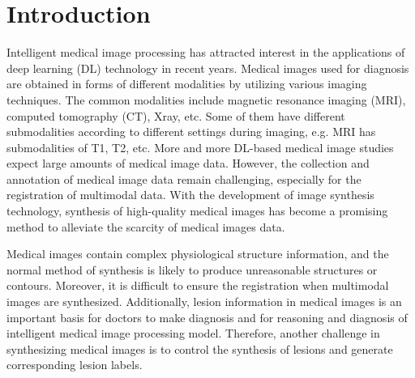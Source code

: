 \documentclass[runningheads]{llncs}
\begin{document}
	\section{Introduction}
	Intelligent medical image processing has attracted interest in the applications of deep learning (DL) technology in recent years. Medical images used for diagnosis are obtained in forms of different modalities by utilizing various imaging techniques. The common modalities include magnetic resonance imaging (MRI), computed tomography (CT), Xray, etc. Some of them have different submodalities according to different settings during imaging, e.g. MRI has submodalities of T1, T2, etc. More and more DL-based medical image studies expect large amounts of medical image data. However, the collection and annotation of medical image data remain challenging, especially for the registration of multimodal data. With the development of image synthesis technology, synthesis of high-quality medical images has become a promising method to alleviate the scarcity of medical images data.
	
	Medical images contain complex physiological structure information, and the normal method of synthesis is likely to produce unreasonable structures or contours. Moreover, it is difficult to ensure the registration when multimodal images are synthesized. Additionally, lesion information in medical images is an important basis for doctors to make diagnosis and for reasoning and diagnosis of intelligent medical image processing model. Therefore, another challenge in synthesizing medical images is to control the synthesis of lesions and generate corresponding lesion labels.
	
\end{document}
